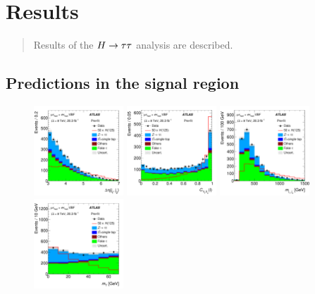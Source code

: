 \chapter[Results][Results]{Results}
\label{chap:results}

\begin{quote}
Results of the $H\rightarrow\tau\tau$ analysis are described.
\end{quote}

\section{Predictions in the signal region}
\label{sec:results-prefit}

\clearpage

\begin{figure}[tp]
  \centering
  \includegraphics[width=0.30\textwidth]{figures/HIGG-2013-32/fig_02c}
  \includegraphics[width=0.30\textwidth]{figures/HIGG-2013-32/figaux_06a}
  \includegraphics[width=0.30\textwidth]{figures/HIGG-2013-32/figaux_06b}
  \includegraphics[width=0.30\textwidth]{figures/HIGG-2013-32/figaux_06c}

\end{figure}
